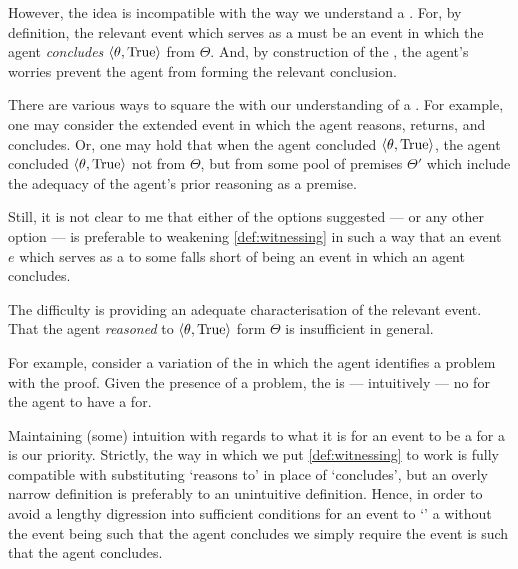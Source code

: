 \begin{note}
  However, the idea is incompatible with the way we understand a .
  For, by definition, the relevant event which serves as a  must be an event in which the agent \emph{concludes} \(\langle \theta, \text{True} \rangle\) from \(\Theta\).
  And, by construction of the , the agent's worries prevent the agent from forming the relevant conclusion.

  There are various ways to square the  with our understanding of a .
  For example, one may consider the extended event in which the agent reasons, returns, and concludes.
  Or, one may hold that when the agent concluded \(\langle \theta, \text{True} \rangle\), the agent concluded \(\langle \theta, \text{True} \rangle\) not from \(\Theta\), but from some pool of premises \(\Theta'\) which include the adequacy of the agent's prior reasoning as a premise.

  Still, it is not clear to me that either of the options suggested --- or any other option --- is preferable to weakening \autoref{def:witnessing} in such a way that an event \(e\) which serves as a \wit{} to some \ros{} falls short of being an event in which an agent concludes.

  The difficulty is providing an adequate characterisation of the relevant event.
  That the agent \emph{reasoned} to \(\langle \theta, \text{True} \rangle\) form \(\Theta\) is insufficient in general.

  For example, consider a variation of the \scen{} in which the agent identifies a problem with the proof.
  Given the presence of a problem, the is --- intuitively --- no \ros{} for the agent to have a  for.

  Maintaining (some) intuition with regards to what it is for an event to be a  for a  is our priority.
  Strictly, the way in which we put \autoref{def:witnessing} to work is fully compatible with substituting `reasons to' in place of `concludes', but an overly narrow definition is preferably to an unintuitive definition.
  Hence, in order to avoid a lengthy digression into sufficient conditions for an event to `' a \ros{} without the event being such that the agent concludes we simply require the event is such that the agent concludes.
\end{note}

\subsection{\supportII{}}
\label{cha:var:ros:II}


